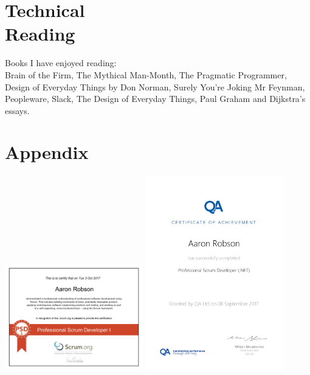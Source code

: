 \documentclass[line,margin]{res}
\begin{document}
\begin{resume}
\section{Technical \\ Reading}
Books I have enjoyed reading: \\
Brain of the Firm,
The Mythical Man-Month, %
The Pragmatic Programmer,
Design of Everyday Things by Don Norman,
Surely You're Joking Mr Feynman,
Peopleware, %
Slack,
The Design of Everyday Things,
Paul Graham and Dijkstra's essays.

\section{Appendix}
\includegraphics[width=0.45\textwidth]{proof/PSDI.PDF}
\includegraphics[width=0.45\textwidth]{proof/50226508_1920.pdf}

\end{resume}
\end{document}

